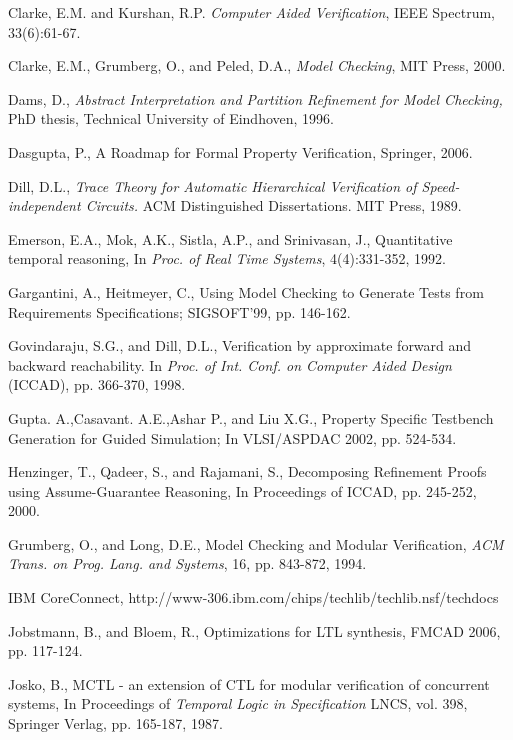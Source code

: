 \documentclass[a4paper, 11pt]{article}
\begin{document}
{\begin{thebibliography}{99}
 Clarke, E.M.  and Kurshan, R.P.
        {\em Computer Aided Verification}, IEEE Spectrum, 33(6):61-67. 

 Clarke, E.M., Grumberg, O., and Peled, D.A.,
        {\em Model Checking}, MIT Press, 2000.

 Dams, D., {\em Abstract Interpretation and Partition Refinement 
	for Model Checking,} PhD thesis, Technical University of Eindhoven, 
	1996.

 Dasgupta, P., A Roadmap for Formal Property Verification,
        Springer, 2006. 

 Dill, D.L., {\em Trace Theory for Automatic Hierarchical
        Verification of Speed-independent Circuits.} ACM Distinguished
        Dissertations. MIT Press, 1989.

 Emerson, E.A., Mok, A.K., Sistla, A.P., and
    Srinivasan, J., Quantitative temporal reasoning, In {\em Proc. of
	Real Time Systems}, 4(4):331-352, 1992.

 Gargantini, A., Heitmeyer, C.,
    Using Model Checking to Generate Tests from Requirements
    Specifications; SIGSOFT'99, pp. 146-162.

 Govindaraju, S.G., and Dill, D.L., Verification by
    approximate forward and backward reachability. In {\em Proc. of
    Int. Conf. on Computer Aided Design} (ICCAD), pp. 366-370, 1998. 

 Gupta. A.,Casavant. A.E.,Ashar P., and Liu X.G.,
         Property Specific Testbench Generation for Guided Simulation;
         In VLSI/ASPDAC 2002, pp. 524-534.

 Henzinger, T., Qadeer, S., and Rajamani, S.,
        Decomposing Refinement Proofs using Assume-Guarantee Reasoning,
        In Proceedings of ICCAD, pp. 245-252, 2000.

 Grumberg, O., and Long, D.E., Model Checking and
    Modular Verification, {\em ACM Trans. on Prog. Lang. and Systems},
    16, pp. 843-872, 1994.

 IBM CoreConnect,
        http://www-306.ibm.com/chips/techlib/techlib.nsf/techdocs 

 Jobstmann, B., and Bloem, R., Optimizations 
	for LTL synthesis, FMCAD 2006, pp. 117-124.

 Josko, B., MCTL - an extension of CTL for modular
        verification of concurrent systems,
        In Proceedings of {\em Temporal Logic in Specification} LNCS, vol.
        398, Springer Verlag, pp. 165-187, 1987.


\end{thebibliography}}
\end{document}
